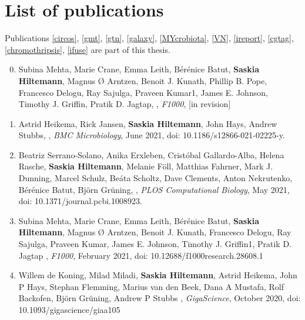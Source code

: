 \chapter{List of publications}
\label{AppendixD}

Publications \ref{circos}, \ref{gmt}, \ref{gtn}, \ref{galaxy}, \ref{MYcrobiota}, \ref{VN}, \ref{ireport}, \ref{cgtag}, \ref{chromothripsis}, \ref{ifuse} are part of this thesis.

\begin{enumerate}
\setcounter{enumi}{-1}

\item Subina Mehta, Marie Crane, Emma Leith, Bérénice Batut, \textbf{Saskia Hiltemann}, Magnus Ø Arntzen, Benoit J. Kunath, Phillip B. Pope, Francesco Delogu, Ray Sajulga, Praveen Kumar1, James E. Johnson, Timothy J. Griffin, Pratik D. Jagtap, {\color{chaptergrey}{ASaiM-MT: a validated and optimized ASaiM workflow for metatranscriptomics analysis within Galaxy framework}}, \textit{F1000}, [in revision]

\item Astrid Heikema, Rick Jansen, \textbf{Saskia Hiltemann}, John Hays, Andrew Stubbs, {\color{chaptergrey}{WeFaceNano: a user-friendly pipeline for complete ONT sequence assembly and detection of antibiotic resistance in multi-plasmid bacterial isolates}}, \textit{BMC Microbiology}, June 2021, doi: 10.1186/s12866-021-02225-y.

\item  Beatriz Serrano-Solano, Anika Erxleben, Cristóbal Gallardo-Alba, Helena Rasche, \textbf{Saskia Hiltemann}, Melanie Föll, Matthias Fahrner, Mark J. Dunning, Marcel Schulz, Beáta Scholtz, Dave Clements, Anton Nekrutenko, Bérénice Batut, Björn Grüning, {\color{chaptergrey}{Fostering Accessible Online Education Using Galaxy as an e-learning Platform}}, \textit{PLOS Computational Biology}, May 2021, doi: 10.1371/journal.pcbi.1008923.

\item Subina Mehta, Marie Crane, Emma Leith, Bérénice Batut, \textbf{Saskia Hiltemann}, Magnus Ø Arntzen, Benoit J. Kunath, Francesco Delogu, Ray Sajulga, Praveen Kumar, James E. Johnson, Timothy J. Griffin1, Pratik D. Jagtap {\color{chaptergrey}{ASaiM-MT: a validated and optimized ASaiM workflow for metatranscriptomics analysis within Galaxy framework}}, \textit{F1000}, February 2021, doi: 10.12688/f1000research.28608.1

\item  Willem de Koning, Milad Miladi, \textbf{Saskia Hiltemann}, Astrid Heikema, John P Hays, Stephan Flemming, Marius van den Beek, Dana A Mustafa, Rolf Backofen, Björn Grüning, Andrew P Stubbs {\color{chaptergrey}{NanoGalaxy: Nanopore long-read sequencing data analysis in Galaxy}}, \textit{GigaScience}, October 2020, doi: 10.1093/gigascience/giaa105 \label{one}


\end{enumerate}
